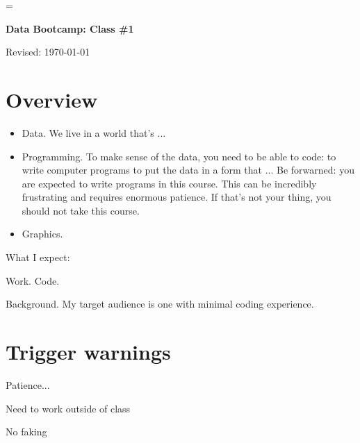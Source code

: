 \documentclass[11pt]{article}
\begin{document}
\parskip=\bigskipamount
\parindent=0.0in
\thispagestyle{empty}


\bigskip\bigskip
\centerline{\Large \bf Data Bootcamp:  Class \#1}
\centerline{Revised: \today}


\section*{Overview}

\begin{itemize}
\item Data. We live in a world that's ...
\item Programming. To make sense of the data, you need to be able to code:
to write computer programs to put the data in a form that ...
Be forwarned:  you are expected to write programs in this course.
This can be incredibly frustrating and requires enormous patience.
If that's not your thing, you should not take this course.
\item Graphics.
\end{itemize}

What I expect:

Work.  Code.

Background. My target audience is one with minimal coding experience.

\section{Trigger warnings}

Patience...

Need to work outside of class 

No faking 
\end{document}
